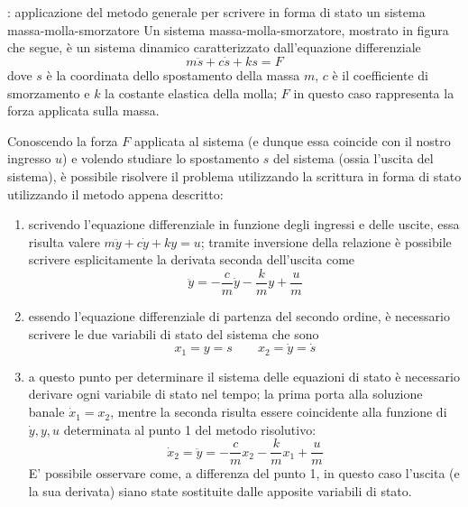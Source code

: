 		\begin{esempio}{: applicazione del metodo generale per scrivere in forma di stato un sistema massa-molla-smorzatore}
			Un sistema massa-molla-smorzatore, mostrato in figura che segue, è un sistema dinamico caratterizzato dall'equazione differenziale
			\[ m\ddot s + c\dot s + ks = F \]
			dove $s$ è la coordinata dello spostamento della massa $m$, $c$ è il coefficiente di smorzamento e $k$ la costante elastica della molla; $F$ in questo caso rappresenta la forza applicata sulla massa.
			
			\begin{center}
			\end{center}
			
			Conoscendo la forza $F$ applicata al sistema (e dunque essa coincide con il nostro ingresso $u$) e volendo studiare lo spostamento $s$ del sistema (ossia l'uscita del sistema), è possibile risolvere il problema utilizzando la scrittura in forma di stato utilizzando il metodo appena descritto:
			\begin{enumerate}
				\item scrivendo l'equazione differenziale in funzione degli ingressi e delle uscite, essa risulta valere $m \ddot y + c\dot y + ky = u$; tramite inversione della relazione è possibile scrivere esplicitamente la derivata seconda dell'uscita come
				\[ \ddot y = - \frac c m \dot y - \frac k m y + \frac u m  \]
				
				\item essendo l'equazione differenziale di partenza del secondo ordine, è necessario scrivere le due variabili di stato del sistema che sono
				\[ x_1 = y = s \qquad x_2 = \dot y = \dot s \]
				
				\item a questo punto per determinare il sistema delle equazioni di stato è necessario derivare ogni variabile di stato nel tempo; la prima porta alla soluzione banale $\dot x_1 = x_2$, mentre la seconda risulta essere coincidente alla funzione di $\dot y,y,u$ determinata al punto 1 del metodo risolutivo:
				\[ \dot x_2 = \ddot y = - \frac c m x_2 - \frac k m x_1 + \frac u m \]
				E' possibile osservare come, a differenza del punto 1, in questo caso l'uscita (e la sua derivata) siano state sostituite dalle apposite variabili di stato.
				
				\vspace{2mm}
				

\end{enumerate}
\end{esempio}
